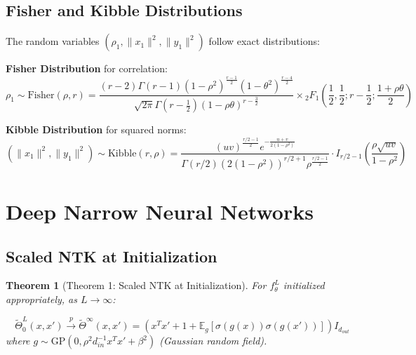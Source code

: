 \documentclass[a4paper]{article}
\newcommand{\E}{\mathbb{E}}
\newcommand{\E}{\mathbb{E}}
\theoremstyle{plain}
\newtheorem{theorem}{Theorem}[section]
\theoremstyle{definition}
\theoremstyle{remark}
\begin{document}
\subsection{Fisher and Kibble Distributions}

\begin{tcolorbox}[colback=blue!15,colframe=blue!50!black,title={\textbf{Exact Probability Laws}},enhanced,drop shadow]
The random variables $(\rho_1, \|x_1\|^2, \|y_1\|^2)$ follow exact distributions:

\textbf{Fisher Distribution} for correlation:
\begin{equation}
\boxed{\rho_1 \sim \text{Fisher}(\rho, r) = \frac{(r-2)\Gamma(r-1)(1-\rho^2)^{\frac{r-1}{2}}(1-\theta^2)^{\frac{r-4}{2}}}{\sqrt{2\pi}\Gamma(r-\frac{1}{2})(1-\rho \theta)^{r-\frac{3}{2}}} \times {}_2F_1\left(\frac{1}{2}, \frac{1}{2}; r-\frac{1}{2}; \frac{1+\rho \theta}{2}\right)}
\end{equation}

\textbf{Kibble Distribution} for squared norms:
\begin{equation}
\boxed{(\|x_1\|^2, \|y_1\|^2) \sim \text{Kibble}(r, \rho) = \frac{(uv)^{\frac{r/2-1}{2}} e^{-\frac{u+v}{2(1-\rho^2)}}}{\Gamma(r/2) (2(1-\rho^2))^{r/2+1} \rho^{\frac{r/2-1}{2}}} \cdot I_{r/2-1}\left(\frac{\rho\sqrt{uv}}{1-\rho^2}\right)}
\end{equation}
\end{tcolorbox}



\newpage


\section{Deep Narrow Neural Networks}

\subsection{Scaled NTK at Initialization}

\begin{theorem}[Theorem 1: Scaled NTK at Initialization]
For $f^L_\theta$ initialized appropriately, as $L \to \infty$:

\begin{tcolorbox}[colback=blue!10,colframe=blue!80!black,title={\textbf{Deep Narrow NTK Limit}},enhanced,drop shadow,boxrule=2pt]
\begin{equation}
\boxed{\tilde{\Theta}^L_0(x, x') \xrightarrow{p} \tilde{\Theta}^\infty(x, x') = (x^T x' + 1 + \E_g[\sigma(g(x))\sigma(g(x'))]) I_{d_{out}}}
\end{equation}
where $g \sim \text{GP}(0, \rho^2 d_{in}^{-1} x^T x' + \beta^2)$ (Gaussian random field).
\end{tcolorbox}
\end{theorem}
\end{document}
